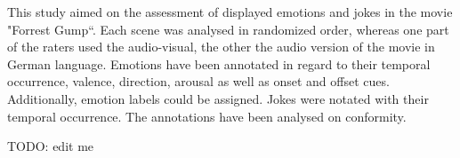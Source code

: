 This study aimed on the assessment of displayed emotions and jokes in the movie
"Forrest Gump“. Each scene was analysed in randomized order, whereas one part
of the raters used the audio-visual, the other the audio version of the movie
in German language. Emotions have been annotated in regard to their temporal
occurrence, valence, direction, arousal as well as onset and offset cues.
Additionally, emotion labels could be assigned. Jokes were notated with their
temporal occurrence. The annotations have been analysed on conformity.

TODO: edit me
